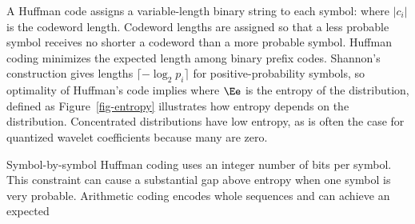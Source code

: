A Huffman code assigns a variable-length binary string to each symbol:
where $|c_i|$ is the codeword length. Codeword lengths are assigned so that a less probable symbol receives no shorter a codeword than a more probable symbol.
Huffman coding minimizes the expected length among binary prefix codes. Shannon's construction gives lengths $\lceil-\log_2p_i\rceil$ for positive-probability symbols, so optimality of Huffman's code implies
where $\Ee$ is the entropy of the distribution, defined as
Figure~\ref{fig-entropy} illustrates how entropy depends on the distribution. Concentrated distributions have low entropy, as is often the case for quantized wavelet coefficients because many are zero.

Symbol-by-symbol Huffman coding uses an integer number of bits per symbol. This constraint can cause a substantial gap above entropy when one symbol is very probable. Arithmetic coding encodes whole sequences and can achieve an expected 
